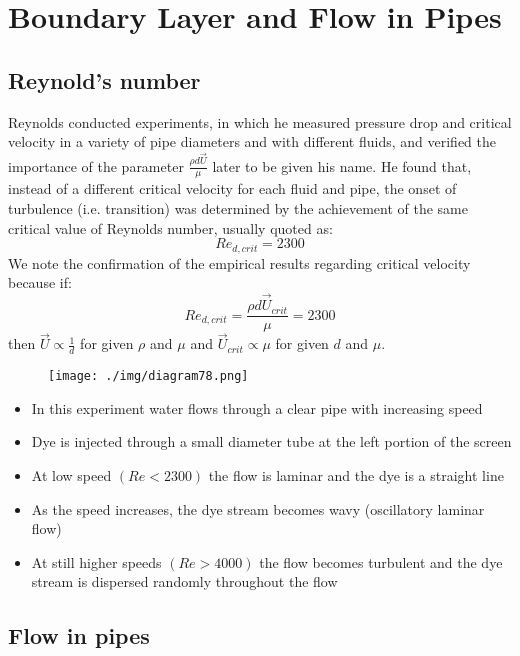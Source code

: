 \chapter{Boundary Layer and Flow in Pipes}
\section{Reynold's number}
Reynolds conducted experiments, in which he measured pressure drop and critical velocity in a variety of pipe diameters and with different fluids, and verified the importance of the parameter $\frac{\rho d \vec{U}}{\mu}$ later to be given his name. He found that, instead of a different critical velocity for each fluid and pipe, the onset of turbulence (i.e. transition) was determined by the achievement of the same critical value of Reynolds number, usually quoted as:
\begin{equation}
  Re_{d,crit} = 2300
\end{equation}
We note the confirmation of the empirical results regarding critical velocity because if:
\begin{equation}
  Re_{d,crit} = \frac{\rho d \vec{U}_{crit}}{\mu} = 2300
\end{equation}
then $\vec{U} \propto \frac{1}{d}$ for given $\rho$ and $\mu$ and $\vec{U}_{crit} \propto \mu$ for given $d$ and $\mu$.
\begin{figure}[H]
  \centering
  \texttt{[image: ./img/diagram78.png]}
  \caption{}
\end{figure}
\begin{itemize}
  \item In this experiment water flows through a clear pipe with increasing speed
  \item Dye is injected through a small diameter tube at the left portion of the screen
  \item At low speed $ \left( Re < 2300 \right)$ the flow is laminar and the dye is a straight line
  \item As the speed increases, the dye stream becomes wavy (oscillatory laminar flow)
  \item At still higher speeds $\left(Re > 4000\right)$ the flow becomes turbulent and the dye stream is dispersed randomly throughout the flow
\end{itemize}
\section{Flow in pipes}
